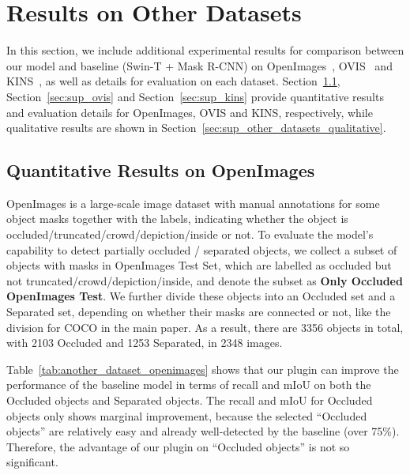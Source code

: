 \documentclass{bmvc2k}
\begin{document}
\section{Results on Other Datasets}
\label{sec:sup_other_datasets}

In this section, we include additional experimental results for comparison between our model and baseline (Swin-T + Mask R-CNN) on OpenImages~\cite{openimages_2020}, OVIS~\cite{qi2022ovis} and KINS~\cite{qi2019kins}, as well as details for evaluation on each dataset. Section~\ref{sec:sup_openimages}, Section~\ref{sec:sup_ovis} and Section~\ref{sec:sup_kins} provide quantitative results and evaluation details for OpenImages, OVIS and KINS, respectively, while qualitative results are shown in Section~\ref{sec:sup_other_datasets_qualitative}.


\subsection{Quantitative Results on OpenImages}
\label{sec:sup_openimages}

OpenImages is a large-scale image dataset with manual annotations for some object masks together with the labels, indicating whether the object is occluded\slash truncated\slash crowd\slash depiction\slash inside or not. 
To evaluate the model's capability to detect partially occluded / separated objects, we collect a subset of objects with masks in OpenImages Test Set, 
which are labelled as occluded but not truncated/crowd/depiction/inside, 
and denote the subset as \textbf{Only Occluded OpenImages Test}. 
We further divide these objects into an Occluded set and a Separated set, depending on whether their masks are connected or not, 
like the division for COCO in the main paper. 
As a result, there are 3356 objects in total, with 2103 Occluded and 1253 Separated, in 2348 images. 

Table~\ref{tab:another_dataset_openimages} shows that our plugin can improve the performance of the baseline model in terms of recall and mIoU on both the Occluded objects and Separated objects. 
The recall and mIoU for Occluded objects only shows marginal improvement, because the selected “Occluded objects” are relatively easy and already well-detected by the baseline (over 75\%). Therefore, the advantage of our plugin on “Occluded objects” is not so significant.
\end{document}
